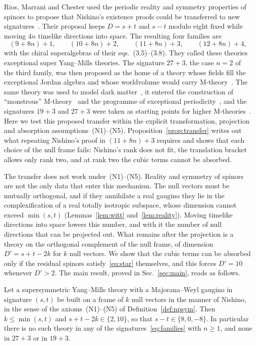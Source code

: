 Rios, Marrani and Chester used the periodic reality and symmetry properties of spinors to propose that Nishino's existence proofs could be transferred to new signatures~\cite[Sec.~III.A]{RiosMarraniChester2019}. Their proposal keeps $D=s+t$ and $s-t$ modulo eight fixed while moving $4n$ timelike directions into space. The resulting four families are
\begin{equation}
\label{eq:families}
(9+8n)+1,\qquad (10+8n)+2,\qquad (11+8n)+3,\qquad (12+8n)+4 ,
\end{equation}
with the chiral superalgebras of their eqs.~(3.5)--(3.8). They called these theories exceptional super Yang--Mills theories. The signature $27+3$, the case $n=2$ of the third family, was then proposed as the home of a theory whose fields fill the exceptional Jordan algebra and whose worldvolume would carry M-theory~\cite{RiosMarraniChester2020}. The same theory was used to model dark matter~\cite{PaduroiuRiosMarraniChester2021}, it entered the construction of ``monstrous'' M-theory~\cite{MarraniRiosChester2023} and the programme of exceptional periodicity~\cite{TruiniMarraniRios2019}, and the signatures $19+3$ and $27+3$ were taken as starting points for higher M-theories~\cite{Banerjee2024}. Here we test this proposed transfer within the explicit transformation, projection and absorption assumptions~(N1)--(N5). Proposition~\ref{prop:transfer} writes out what repeating Nishino's proof in $(11+8n)+3$ requires and shows that each choice of the null frame fails: Nishino's rank does not fit, the translation bracket allows only rank two, and at rank two the cubic terms cannot be absorbed.

The transfer does not work under~(N1)--(N5). Reality and symmetry of spinors are not the only data that enter this mechanism. The null vectors must be mutually orthogonal, and if they annihilate a real gaugino they lie in the complexification of a real totally isotropic subspace, whose dimension cannot exceed $\min(s,t)$ (Lemmas~\ref{lem:witt} and~\ref{lem:reality}). Moving timelike directions into space lowers this number, and with it the number of null directions that can be projected out. What remains after the projection is a theory on the orthogonal complement of the null frame, of dimension $D'=s+t-2k$ for $k$ null vectors. We show that the cubic terms can be absorbed only if the residual spinors satisfy~\eqref{eq:star} themselves, and this forces $D'=10$ whenever $D'>2$. The main result, proved in Sec.~\ref{sec:main}, reads as follows.

\begin{maintheorem}
Let a supersymmetric Yang--Mills theory with a Majorana--Weyl gaugino in signature $(s,t)$ be built on a frame of $k$ null vectors in the manner of Nishino, in the sense of the axioms~(N1)--(N5) of Definition~\ref{def:npsym}. Then $k\le\min(s,t)$ and $s+t-2k\in\{2,10\}$, so that $s-t\in\{8,0,-8\}$. In particular there is no such theory in any of the signatures~\eqref{eq:families} with $n\ge1$, and none in $27+3$ or in $19+3$.
\end{maintheorem}

